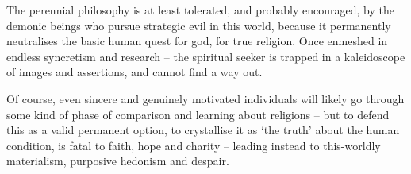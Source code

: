 \begin{footnotesize}
\begin{sffamily}
The perennial philosophy is at least tolerated, and probably encouraged, by the demonic beings who pursue strategic evil in this world, because it permanently neutralises the basic human quest for god, for true religion. Once enmeshed in endless syncretism and research -- the spiritual seeker is trapped in a kaleidoscope of images and assertions, and cannot find a way out.

Of course, even sincere and genuinely motivated individuals will likely go through some kind of phase of comparison and learning about religions -- but to defend this as a valid permanent option, to crystallise it as `the truth' about the human condition, is fatal to faith, hope and charity -- leading instead to this-worldly materialism, purposive hedonism and despair.

\end{sffamily}
\end{footnotesize}

